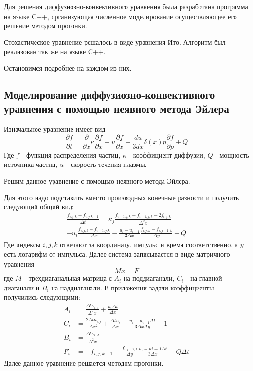 \documentclass[a4paper,14pt]{extarticle} %
\begin{document}
Для решения диффузиозно-конвективного уравнения была разработана программа на языке C++, организующая численное моделирование осуществляющее его решение методом прогонки.

Стохастическое уравнение решалось в виде уравнения Ито. Алгоритм был реализован так же на языке C++.

Остановимся подробнее на каждом из них.
\subsection{Моделирование диффузиозно-конвективного уравнения с помощью неявного метода Эйлера}
Изначальное уравнение имеет вид \cite{Kang}
\begin{equation}
\frac{\partial f}{\partial t} = \frac{\partial}{\partial x} \kappa \frac{\partial f}{\partial x} - u \frac{\partial f}{\partial x} - \frac{du}{3dx} \delta(x) p \frac{\partial f}{\partial p} +Q
\end{equation}
Где $f$ - функция распределения частиц, $\kappa$ - коэффициент диффузии, $Q$ - мощность источника частиц, $u$ - скорость течения плазмы.

Решим данное уравнение с помощью неявного метода Эйлера.

Для этого надо подставить вместо производных конечные разности и получить следующий общий вид:
\begin{multline}
\frac{f_{i,j,k} - f_{i,j,k-1}}{\Delta t} = \kappa_{j} \frac{f_{i+1,j,k}+f_{i-1,j,k}-2f_{i,j,k}}{\Delta^2 x} \\
- u_i\frac{f_{i,j,k}-f_{i-1,j,k}}{\Delta x}-\frac{u_i-u_{i-1}}{3\Delta x}\frac{f_{i,j,k}-f_{i,j-1,k}}{\Delta y} + Q
\end{multline}
Где индексы $i, j, k$ отвечают за координату, импульс и время соответственно, а $y$ есть логарифм от импульса.
Далее система записывается в виде матричного уравнения
\begin{equation}
Mx=F
\end{equation}
где $M$ - трёхдиаганальная матрица с $A_i$ на поддиаганали, $C_i$ - на главной диаганали и $B_i$ на наддиаганали. В приложении задачи коэффициенты получились следующими:
\begin{eqnarray}
A_i&=\frac{\Delta t \kappa_{i,j}}{\Delta^2 x} + \frac{u_i\Delta t}{\Delta x}\\
C_i&=\frac{2\Delta t \kappa_{i,j}}{\Delta x^2} + \frac{\Delta t u_i}{\Delta x} + \frac{u_i-u_{i-1}\Delta t}{3\Delta x \Delta y} - 1\\
B_i&=\frac{\Delta t \kappa_{i,J}}{\Delta^2 x}\\
F_i&=-f_{i,j,k-1}-\frac{f_{i,j-1,k}}{\Delta y} \frac{u_i-u{i-1}\Delta t}{3\Delta x} - Q\Delta t
\end{eqnarray} 
Далее данное уравнение решается методом прогонки.\cite{progon}
\end{document}
